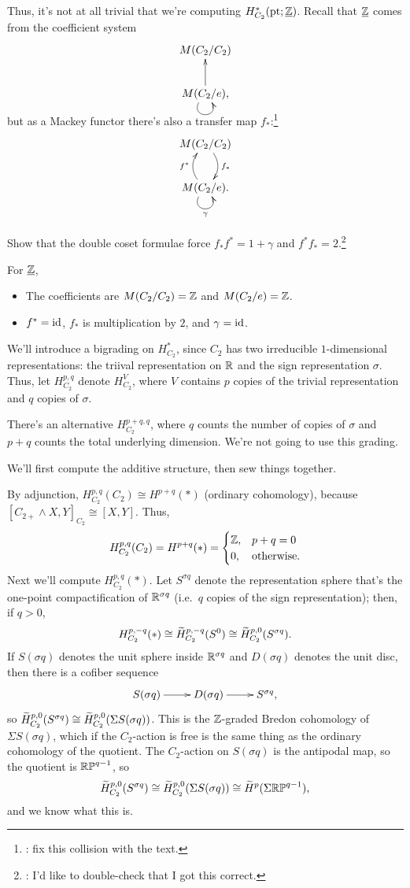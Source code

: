 Thus, it's not at all trivial that we're computing $H_{C_2}^*(\mathrm{pt};\underline{\mathbb Z})$. Recall that $\underline{\mathbb Z}$ comes
from the coefficient system
\[\xymatrix{
	M(C_2/C_2)\\
	M(C_2/e),\ar[u]\ar@(dl,dr)
}\]
but as a Mackey functor there's also a transfer map $f_*$:\footnote{\TODO: fix this \Xy{} collision with the text.}
\[\xymatrix{
	M(C_2/C_2)\ar@/^0.4cm/[d]^{f_*}\\
	M(C_2/e).\ar@/^0.4cm/[u]^{f^*}\ar@(dl,dr)_\gamma
}\]
\begin{ex}
Show that the double coset formulae force $f_*f^* = 1+\gamma$ and $f^*f_* = 2$.\footnote{\TODO: I'd like to
double-check that I got this correct.}
\end{ex}
For $\underline{\mathbb Z}$,
\begin{itemize}
	\item The coefficients are $M(C_2/C_2) = \mathbb Z$ and $M(C_2/e) = \mathbb Z$.
	\item $f^* = \mathrm{id}$, $f_*$ is multiplication by $2$, and $\gamma = \mathrm{id}$.
\end{itemize}
We'll introduce a bigrading on $H^*_{C_2}$, since $C_2$ has two irreducible $1$-dimensional representations: the
triival representation on $\mathbb R$ and the sign representation $\sigma$. Thus, let $H_{C_2}^{p,q}$ denote $H_{C_2}^V$,
where $V$ contains $p$ copies of the trivial representation and $q$ copies of $\sigma$.
\begin{rem}
There's an alternative  $H_{C_2}^{p+q,q}$, where $q$ counts the number of copies of $\sigma$
and $p+q$ counts the total underlying dimension. We're not going to use this grading.
\end{rem}
We'll first compute the additive structure, then sew things together.

By adjunction, $H_{C_2}^{p,q}(C_2)\cong H^{p+q}(*)$ (ordinary cohomology), because $[C_{2+}\wedge X, Y]_{C_2}\cong
[X,Y]$. Thus,
\[H_{C_2}^{p,q}(C_2) = H^{p+q}(*) = \begin{cases}
	\mathbb Z, &p+q=0\\
	0, &\text{otherwise.}
\end{cases}\]
Next we'll compute $H_{C_2}^{p,q}(*)$. Let $S^{\sigma q}$ denote the representation sphere that's the one-point
compactification of $\mathbb R^{\sigma q}$ (i.e.\ $q$ copies of the sign representation); then, if $q > 0$,
\[H_{C_2}^{p,-q}(*)\cong \widetilde H_{C_2}^{p,-q}(S^0)\cong \widetilde H_{C_2}^{p,0}(S^{\sigma q}).\]
If $S(\sigma q)$ denotes the unit sphere inside $\mathbb R^{\sigma q}$ and $D(\sigma q)$ denotes the unit disc, then there
is a cofiber sequence
\[\xymatrix{
	S(\sigma q)\ar[r] & D(\sigma q)\ar[r] & S^{\sigma q},
}\]
so $\widetilde H_{C_2}^{p,0}(S^{\sigma q})\cong\widetilde H_{C_2}^{p,0}(\Sigma S(\sigma q))$. This is the $\mathbb Z$-graded Bredon
cohomology of $\Sigma S(\sigma q)$, which if the $C_2$-action is free is the same thing as the ordinary cohomology
of the quotient. The $C_2$-action on $S(\sigma q)$ is the antipodal map, so the quotient is $\mathbb{RP}^{q-1}$, so
\[\widetilde H_{C_2}^{p,0}(S^{\sigma q})\cong \widetilde H_{C_2}^{p,0}(\Sigma S(\sigma q))\cong \widetilde H^p(\Sigma\mathbb{RP}^{q-1}),\]
and we know what this is.

